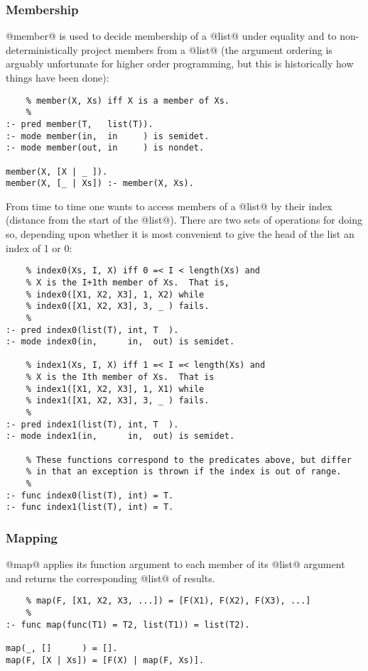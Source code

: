 \subsubsection{Membership}


@member@ is used to decide membership of a @list@ under equality and to
non-deterministically project members from a @list@ (the argument ordering
is arguably unfortunate for higher order programming, but this is
historically how things have been done):
\begin{verbatim}
    % member(X, Xs) iff X is a member of Xs.
    %
:- pred member(T,   list(T)).
:- mode member(in,  in     ) is semidet.
:- mode member(out, in     ) is nondet.

member(X, [X | _ ]).
member(X, [_ | Xs]) :- member(X, Xs).
\end{verbatim}
From time to time one wants to access members of a @list@ by their index
(\ie distance from the start of the @list@).  There are two sets of
operations for doing so, depending upon whether it is most convenient to
give the head of the list an index of 1 or 0:
\begin{verbatim}
    % index0(Xs, I, X) iff 0 =< I < length(Xs) and
    % X is the I+1th member of Xs.  That is,
    % index0([X1, X2, X3], 1, X2) while
    % index0([X1, X2, X3], 3, _ ) fails.
    %
:- pred index0(list(T), int, T  ).
:- mode index0(in,      in,  out) is semidet.

    % index1(Xs, I, X) iff 1 =< I =< length(Xs) and
    % X is the Ith member of Xs.  That is
    % index1([X1, X2, X3], 1, X1) while
    % index1([X1, X2, X3], 3, _ ) fails.
    %
:- pred index1(list(T), int, T  ).
:- mode index1(in,      in,  out) is semidet.

    % These functions correspond to the predicates above, but differ
    % in that an exception is thrown if the index is out of range.
    %
:- func index0(list(T), int) = T.
:- func index1(list(T), int) = T.
\end{verbatim}

\subsubsection{Mapping}

@map@ applies its function argument to each member of its @list@ argument
and returns the corresponding @list@ of results.
\begin{verbatim}
    % map(F, [X1, X2, X3, ...]) = [F(X1), F(X2), F(X3), ...]
    %
:- func map(func(T1) = T2, list(T1)) = list(T2).

map(_, []      ) = [].
map(F, [X | Xs]) = [F(X) | map(F, Xs)].
\end{verbatim}

